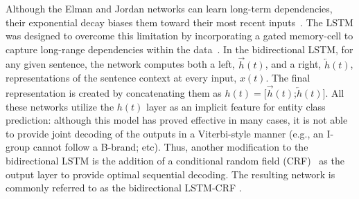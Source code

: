 \documentclass[11pt,letterpaper]{article}
\begin{document}
Although the Elman and Jordan networks can learn long-term dependencies, their exponential decay biases them toward their most recent inputs~\cite{bengio1994learning}. The LSTM was designed to overcome this limitation by incorporating a gated memory-cell to capture long-range dependencies within the data~\cite{hochreiter1997long}. In the bidirectional LSTM, for any given sentence, the network computes both a left, $\overrightarrow{h}(t)$, and a right, $\overleftarrow{ h}(t)$, representations of the sentence context at every input, $x(t)$. The final representation is created by concatenating them as $h(t) = [\overrightarrow{h}(t)$;$\overleftarrow{ h}(t)]$. All these networks utilize the $h(t)$ layer as an implicit feature for entity class prediction: although this model has proved effective in many cases, it is not able to provide joint decoding of the outputs in a Viterbi-style manner (e.g., an I-group cannot follow a B-brand; etc). Thus, another modification to the bidirectional LSTM is the addition of a conditional random field (CRF)~\cite{lafferty2001conditional} as the output layer to provide optimal sequential decoding. The resulting network is commonly referred to as the bidirectional LSTM-CRF \cite{lample2016neural}.

\begin{table*}[ht]	
	\centering
	\caption{Performance comparison between the recurrent neural networks (bottom three lines) and state-of-the-art systems (top three lines) over the SemEval-2013 Task 9.1.}
	\label{table3}
\end{table*}
\end{document}
